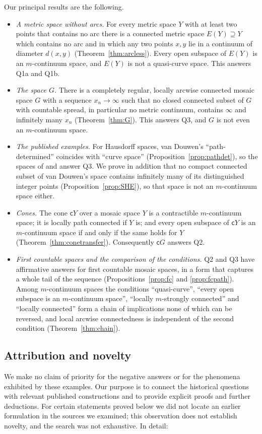 \documentclass[11pt]{amsart}
\theoremstyle{definition}
\theoremstyle{remark}
\newcommand{\cone}{\mathsf{c}}
\numberwithin{equation}{section}
\begin{document}
Our principal results are the following.

\begin{itemize}[leftmargin=2em]
\item \emph{A metric space without arcs.} For every metric space $Y$ with at least two points that contains no arc there is a connected metric space $E(Y)\supseteq Y$ which contains no arc and in which any two points $x,y$ lie in a continuum of diameter $d(x,y)$ (Theorem~\ref{thm:arcless}). Every open subspace of $E(Y)$ is an $m$-continuum space, and $E(Y)$ is not a quasi-curve space. This answers Q1a and Q1b.
\item \emph{The space $G$.} There is a completely regular, locally arcwise connected mosaic space $G$ with a sequence $x_n\to\infty$ such that no closed connected subset of $G$ with countable spread, in particular no metric continuum, contains $\infty$ and infinitely many $x_n$ (Theorem~\ref{thm:G}). This answers Q3, and $G$ is not even an $m$-continuum space.
\item \emph{The published examples.} For Hausdorff spaces, van Douwen's ``path-determined'' coincides with ``curve space'' (Proposition~\ref{prop:pathdet}), so the spaces of \cite{fst79} and \cite{vandouwen81} answer Q3. We prove in addition that no compact connected subset of van Douwen's space contains infinitely many of its distinguished integer points (Proposition~\ref{prop:SHE}), so that space is not an $m$-continuum space either.
\item \emph{Cones.} The cone $\cone Y$ over a mosaic space $Y$ is a contractible $m$-continuum space; it is locally path connected if $Y$ is; and every open subspace of $\cone Y$ is an $m$-continuum space if and only if the same holds for $Y$ (Theorem~\ref{thm:conetransfer}). Consequently $\cone G$ answers Q2.
\item \emph{First countable spaces and the comparison of the conditions.} Q2 and Q3 have affirmative answers for first countable mosaic spaces, in a form that captures a whole tail of the sequence (Propositions~\ref{prop:fc} and \ref{prop:fcpath}). Among $m$-continuum spaces the conditions ``quasi-curve'', ``every open subspace is an $m$-continuum space'', ``locally $m$-strongly connected'' and ``locally connected'' form a chain of implications none of which can be reversed, and local arcwise connectedness is independent of the second condition (Theorem~\ref{thm:chain}).
\end{itemize}

\subsection{Attribution and novelty}\label{sec:attribution}
We make no claim of priority for the negative answers or for the phenomena exhibited by these examples. Our purpose is to connect the historical questions with relevant published constructions and to provide explicit proofs and further deductions. For certain statements proved below we did not locate an earlier formulation in the sources we examined; this observation does not establish novelty, and the search was not exhaustive. In detail:
\end{document}
